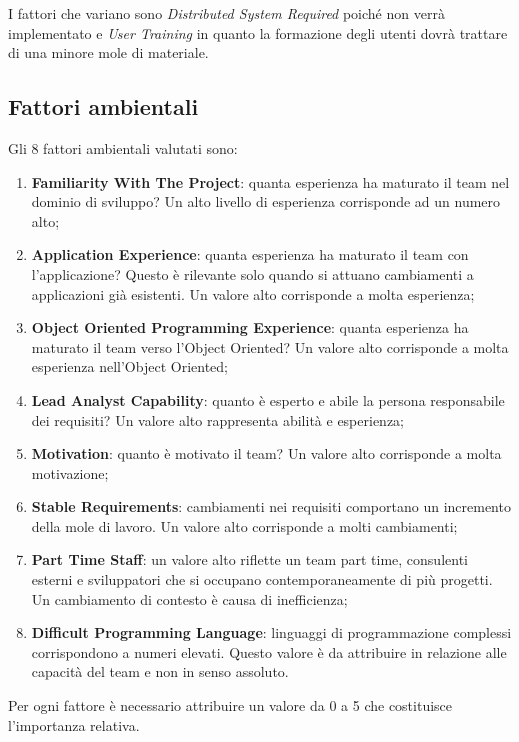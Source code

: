 I fattori che variano sono \emph{Distributed System Required} poiché non verrà implementato  e \emph{User Training} in quanto la formazione degli utenti dovrà trattare di una minore mole di materiale.


\subsection{Fattori ambientali}

Gli 8 fattori ambientali valutati sono:

\begin{enumerate}
	\item \textbf{Familiarity With The Project}: quanta esperienza ha maturato il team nel dominio di sviluppo? Un alto livello di esperienza corrisponde ad un numero alto;
	\item \textbf{Application Experience}: quanta esperienza ha maturato il team con l'applicazione? Questo è rilevante solo quando si attuano cambiamenti a applicazioni già esistenti. Un valore alto corrisponde a molta esperienza;
	\item \textbf{Object Oriented Programming Experience}: quanta esperienza ha maturato il team verso l'Object Oriented? Un valore alto corrisponde a molta esperienza nell'Object Oriented;
	\item \textbf{Lead Analyst Capability}: quanto è esperto e abile la persona responsabile dei requisiti? Un valore alto rappresenta abilità e esperienza;
	\item \textbf{Motivation}: quanto è motivato il team? Un valore alto corrisponde a molta motivazione;
	\item \textbf{Stable Requirements}: cambiamenti nei requisiti comportano un incremento della mole di lavoro. Un valore alto corrisponde a molti cambiamenti;
	\item \textbf{Part Time Staff}: un valore alto riflette un team part time, consulenti esterni e sviluppatori che si occupano contemporaneamente di più progetti. Un cambiamento di contesto è causa di inefficienza;
	\item \textbf{Difficult Programming Language}: linguaggi di programmazione complessi corrispondono a numeri elevati. Questo valore è da attribuire in relazione alle capacità del team e non in senso assoluto.
\end{enumerate}

Per ogni fattore è necessario attribuire un valore da 0 a 5 che costituisce l'importanza relativa.


